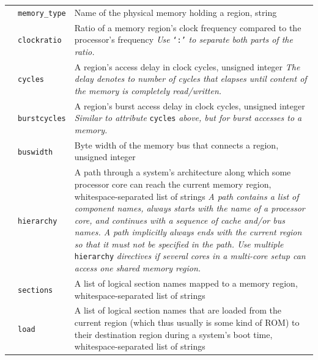 \begin{table}[!ht]
\begin{center}
\begin{tabular}{|p{15mm}|p{33mm}|p{11.3cm}|}
      \hhline{|~|-|-|}
      & \small\texttt{memory\_type} & Name of the physical memory holding a region, string \\
      \hhline{|~|-|-|}
      & \small\texttt{clockratio} & Ratio of a memory region's clock frequency compared to the processor's frequency \newline \textit{Use} \texttt{`:'} \textit{to separate both parts of the ratio.} \\
      \hhline{|~|-|-|}
      & \small\texttt{cycles} & A region's access delay in clock cycles, unsigned integer \newline \textit{The delay denotes to number of cycles that elapses until content of the memory is completely read/written.} \\
      \hhline{|~|-|-|}
      & \small\texttt{burstcycles} & A region's burst access delay in clock cycles, unsigned integer \newline \textit{Similar to attribute} \texttt{\small cycles} \textit{above, but for burst accesses to a memory.} \\
      \hhline{|~|-|-|}
      & \small\texttt{buswidth} & Byte width of the memory bus that connects a region, unsigned integer \\
      \hhline{|~|-|-|}
      & \small\texttt{hierarchy} & A path through a system's architecture along which some processor core can reach the current memory region, whitespace-separated list of strings \newline \textit{A path contains a list of component names, always starts with the name of a processor core, and continues with a sequence of cache and/or bus names. A path implicitly always ends with the current region so that it must not be specified in the path. \newline
      Use multiple} \texttt{\small hierarchy} \textit{directives if several cores in a multi-core setup can access one shared memory region.} \\
      \hhline{|~|-|-|}
      & \small\texttt{sections} & A list of logical section names mapped to a memory region, whitespace-separated list of strings \\
      \hhline{|~|-|-|}
      & \small\texttt{load} & A list of logical section names that are loaded from the current region (which thus usually is some kind of \gls{ROM}) to their destination region during a system's boot time, whitespace-separated list of strings \\
      \hline
    \end{tabular}
  \end{center}
\end{table}

